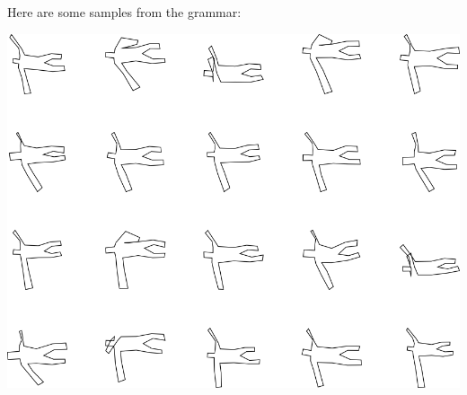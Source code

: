 Here are some samples from the grammar:

\includegraphics[width=6in]{output/3.learning/incremental/gram.9.d/samples.png}

